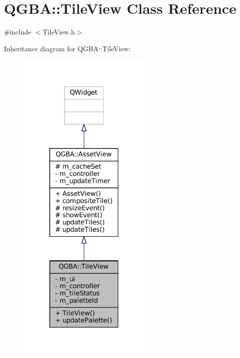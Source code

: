 \hypertarget{class_q_g_b_a_1_1_tile_view}{}\section{Q\+G\+BA\+:\+:Tile\+View Class Reference}
\label{class_q_g_b_a_1_1_tile_view}


{\ttfamily \#include $<$Tile\+View.\+h$>$}



Inheritance diagram for Q\+G\+BA\+:\+:Tile\+View\+:
\nopagebreak
\begin{figure}[H]
\begin{center}
\leavevmode
\includegraphics[width=184pt]{class_q_g_b_a_1_1_tile_view__inherit__graph}
\end{center}
\end{figure}


